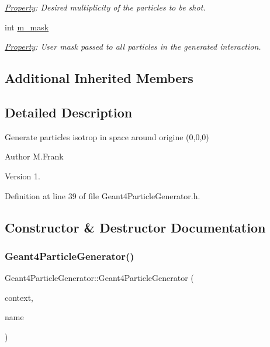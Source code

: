 \begin{DoxyCompactItemize}
\begin{DoxyCompactList}\small\item\em \hyperlink{class_d_d4hep_1_1_property}{Property}\+: Desired multiplicity of the particles to be shot. \end{DoxyCompactList}\item 
int \hyperlink{class_d_d4hep_1_1_simulation_1_1_geant4_particle_generator_a725064da51fefbd1410e0d0e5292d6c8}{m\+\_\+mask}
\begin{DoxyCompactList}\small\item\em \hyperlink{class_d_d4hep_1_1_property}{Property}\+: User mask passed to all particles in the generated interaction. \end{DoxyCompactList}\end{DoxyCompactItemize}
\subsection*{Additional Inherited Members}


\subsection{Detailed Description}
Generate particles isotrop in space around origine (0,0,0) 

\begin{DoxyAuthor}{Author}
M.\+Frank 
\end{DoxyAuthor}
\begin{DoxyVersion}{Version}
1. 
\end{DoxyVersion}


Definition at line 39 of file Geant4\+Particle\+Generator.\+h.



\subsection{Constructor \& Destructor Documentation}
\hypertarget{class_d_d4hep_1_1_simulation_1_1_geant4_particle_generator_a5a3f47d84f92db9d572be0fa5f0e3779}{}\label{class_d_d4hep_1_1_simulation_1_1_geant4_particle_generator_a5a3f47d84f92db9d572be0fa5f0e3779} 
\subsubsection{\texorpdfstring{Geant4\+Particle\+Generator()}{Geant4ParticleGenerator()}}
{\footnotesize\ttfamily Geant4\+Particle\+Generator\+::\+Geant4\+Particle\+Generator (\begin{DoxyParamCaption}\item[{\hyperlink{class_d_d4hep_1_1_simulation_1_1_geant4_context}{Geant4\+Context} $\ast$}]{context,  }\item[{const std\+::string \&}]{name }\end{DoxyParamCaption})}




